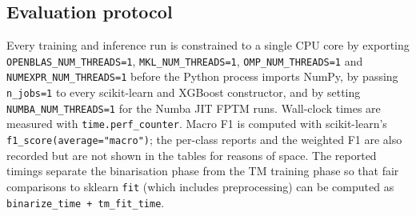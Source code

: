 \documentclass[journal,10pt]{IEEEtran}
\begin{document}
\subsection{Evaluation protocol}
Every training and inference run is constrained to a single CPU core
by exporting \texttt{OPENBLAS\_NUM\_THREADS=1},
\texttt{MKL\_NUM\_THREADS=1}, \texttt{OMP\_NUM\_THREADS=1} and
\texttt{NUMEXPR\_NUM\_THREADS=1} before the Python process imports
NumPy, by passing \texttt{n\_jobs=1} to every scikit-learn and
XGBoost constructor, and by setting \texttt{NUMBA\_NUM\_THREADS=1}
for the Numba JIT FPTM runs. Wall-clock times are measured with
\texttt{time.perf\_counter}. Macro F1 is computed with scikit-learn's
\texttt{f1\_score(average="macro")}; the per-class reports and the
weighted F1 are also recorded but are not shown in the tables for
reasons of space. The reported timings separate the binarisation
phase from the TM training phase so that fair comparisons to sklearn
\texttt{fit} (which includes preprocessing) can be computed as
\texttt{binarize\_time + tm\_fit\_time}.


\end{document}
